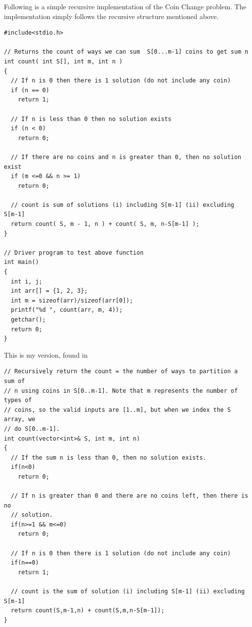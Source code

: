 Following is a simple recursive implementation of the Coin Change problem.
The implementation simply follows the recursive structure mentioned above.
\begin{lstlisting}[style=raycppnewsnippet]
#include<stdio.h>
 
// Returns the count of ways we can sum  S[0...m-1] coins to get sum n
int count( int S[], int m, int n )
{
  // If n is 0 then there is 1 solution (do not include any coin)
  if (n == 0)
    return 1;
   
  // If n is less than 0 then no solution exists
  if (n < 0)
    return 0;
 
  // If there are no coins and n is greater than 0, then no solution exist
  if (m <=0 && n >= 1)
    return 0;
 
  // count is sum of solutions (i) including S[m-1] (ii) excluding S[m-1]
  return count( S, m - 1, n ) + count( S, m, n-S[m-1] );
}
 
// Driver program to test above function
int main()
{
  int i, j;
  int arr[] = {1, 2, 3};
  int m = sizeof(arr)/sizeof(arr[0]);
  printf("%d ", count(arr, m, 4));
  getchar();
  return 0;
}
\end{lstlisting}

\RayNotesBegin

This is my version, found in\\
\begin{lstlisting}[style=raycppnewsnippet]
// Recursively return the count = the number of ways to partition a sum of 
// n using coins in S[0..m-1]. Note that m represents the number of types of
// coins, so the valid inputs are [1..m], but when we index the S array, we
// do S[0..m-1].
int count(vector<int>& S, int m, int n)
{
  // If the sum n is less than 0, then no solution exists.
  if(n<0)
    return 0;

  // If n is greater than 0 and there are no coins left, then there is no
  // solution.
  if(n>=1 && m<=0)
    return 0;

  // If n is 0 then there is 1 solution (do not include any coin)
  if(n==0)
    return 1;
  
  // count is the sum of solution (i) including S[m-1] (ii) excluding S[m-1]
  return count(S,m-1,n) + count(S,m,n-S[m-1]);
}
\end{lstlisting}

\RayNotesEnd

